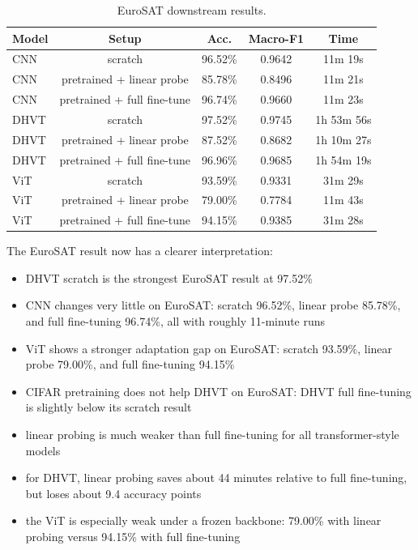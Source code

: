 \documentclass[11pt]{article}
\begin{document}
\begin{table}[H]
\centering
\caption{EuroSAT downstream results.}
\begin{tabular}{lcccc}
\toprule
Model & Setup & Acc. & Macro-F1 & Time \\
\midrule
CNN & scratch & 96.52\% & 0.9642 & 11m 19s \\
CNN & pretrained + linear probe & 85.78\% & 0.8496 & 11m 21s \\
CNN & pretrained + full fine-tune & 96.74\% & 0.9660 & 11m 23s \\
DHVT & scratch & 97.52\% & 0.9745 & 1h 53m 56s \\
DHVT & pretrained + linear probe & 87.52\% & 0.8682 & 1h 10m 27s \\
DHVT & pretrained + full fine-tune & 96.96\% & 0.9685 & 1h 54m 19s \\
ViT & scratch & 93.59\% & 0.9331 & 31m 29s \\
ViT & pretrained + linear probe & 79.00\% & 0.7784 & 11m 43s \\
ViT & pretrained + full fine-tune & 94.15\% & 0.9385 & 31m 28s \\
\bottomrule
\end{tabular}
\end{table}

The EuroSAT result now has a clearer interpretation:
\begin{itemize}
    \item DHVT scratch is the strongest EuroSAT result at 97.52\%
    \item CNN changes very little on EuroSAT: scratch 96.52\%, linear probe 85.78\%, and full fine-tuning 96.74\%, all with roughly 11-minute runs
    \item ViT shows a stronger adaptation gap on EuroSAT: scratch 93.59\%, linear probe 79.00\%, and full fine-tuning 94.15\%
    \item CIFAR pretraining does not help DHVT on EuroSAT: DHVT full fine-tuning is slightly below its scratch result
    \item linear probing is much weaker than full fine-tuning for all transformer-style models
    \item for DHVT, linear probing saves about 44 minutes relative to full fine-tuning, but loses about 9.4 accuracy points
    \item the ViT is especially weak under a frozen backbone: 79.00\% with linear probing versus 94.15\% with full fine-tuning
\end{itemize}
\end{document}
